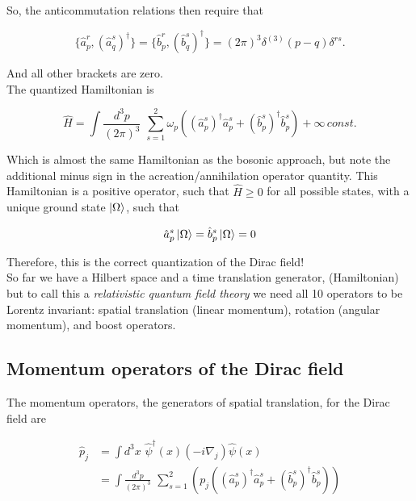 \noindent So, the anticommutation relations then require that

\begin{equation}
\{\hat{a}_p^r, (\hat{a}_q^s)^\dagger \} =  \{\hat{b}_p^r, (\hat{b}_q^s)^\dagger \}  = (2 \pi)^3 \delta^{(3)} (p-q) \delta^{rs}.
\end{equation}

\noindent And all other brackets are zero. \\

\noindent The quantized Hamiltonian is

\begin{equation}
\hat{H} = \int \frac{d^3 p}{(2 \pi)^3} \,\,  \sum_{s=1}^2 \omega_p \left( (\hat{a}_p^s)^\dagger \hat{a}_p^s + (\hat{b}_p^s)^\dagger \hat{b}_p^s \right) + \infty \, const.
\end{equation}

\noindent Which is almost the same Hamiltonian as the bosonic approach, but note the additional minus sign in the acreation/annihilation operator quantity. This Hamiltonian is a positive operator, such that $\hat{H} \ge 0$ for all possible states, with a unique ground state $\ket{\Omega}$, such that

\begin{equation}
\hat{a}_p^s \ket{\Omega} = \hat{b}_p^s \ket{\Omega} = 0
\end{equation}

\noindent Therefore, this is the correct quantization of the Dirac field! \\

\noindent So far we have a Hilbert space and a time translation generator, (Hamiltonian) but to call this a \textit{relativistic quantum field theory} we need all 10 operators to be Lorentz invariant: spatial translation (linear momentum), rotation (angular momentum), and boost operators. \\

\subsection*{Momentum operators of the Dirac field}

\noindent The momentum operators, the generators of spatial translation, for the Dirac field are

\begin{align}
\hat{p}_j &= \int d^3x \,\, \hat{\psi}^\dagger(x) (-i \nabla_j) \hat{\psi} (x) \\
&= \int \frac{d^3 p}{(2 \pi)^3} \,\, \sum_{s=1}^2 \left( p_j \left( (\hat{a}_p^s)^\dagger \hat{a}_p^s + (\hat{b}_p^s)^\dagger \hat{b}_p^s  \right) \right)
\end{align}

